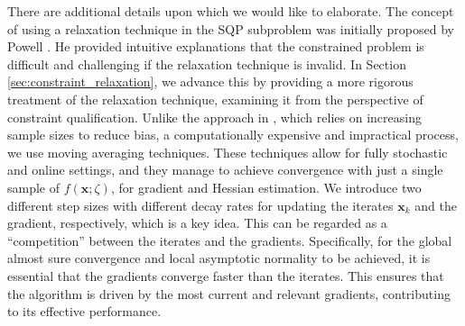 \documentclass[aos]{imsart}
\numberwithin{equation}{section}
\theoremstyle{plain}
\begin{document}
There are additional details upon which we would like to elaborate. 
The concept of using a relaxation technique in the SQP subproblem was initially proposed by Powell \cite{powell2006fast}. He provided intuitive explanations that the constrained problem is difficult and challenging if the relaxation technique is invalid. In Section \ref{sec:constraint_relaxation}, we advance this by providing a more rigorous treatment of the relaxation technique, examining it from the perspective of constraint qualification.
Unlike the approach in \cite{curtis2023sequential}, which relies on increasing sample sizes to reduce bias, a computationally expensive and impractical process, we use moving averaging techniques. 
These techniques allow for fully stochastic and online settings, and they manage to achieve convergence with just a single sample of $f(\bm{x};\zeta)$, for gradient and Hessian estimation. 
We introduce two different step sizes with different decay rates for updating the iterates $\bm{x}_k$ and the gradient, respectively, which is a key idea. 
This can be regarded as a ``competition'' between the iterates and the gradients. 
Specifically, for the global almost sure convergence and local asymptotic normality to be achieved, it is essential that the gradients converge faster than the iterates. 
This ensures that the algorithm is driven by the most current and relevant gradients, contributing to its effective performance.
\end{document}
